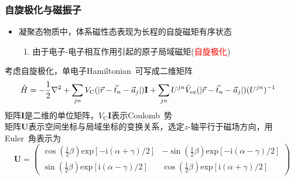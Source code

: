 {\frame
{
	\frametitle{自旋极化与磁振子}
	\begin{itemize}
		\item 凝聚态物质中，体系磁性态表现为长程的自旋磁矩有序状态
			\begin{enumerate}
				\item 由于电子-电子相互作用引起的原子局域磁矩(\textcolor{red}{自旋极化})
			\end{enumerate}
	\end{itemize}
		考虑自旋极化，单电子\textrm{Hamiltonian~}可写成二维矩阵
			\begin{displaymath}
				\hspace*{-10pt}\hat H=-\frac12\nabla^2+\sum_{jn}V_{\mathrm C}(|\vec r-\vec t_n-\vec a_j|)\mathbf{I}+\sum_{jn}U^{jn}\hat{V}_{\mathrm{ex}}(|\vec r-\vec t_n-\vec a_j|)(U^{jn})^{-1}
			\end{displaymath}
			矩阵$\mathbf{I}$是二维的单位矩阵，$V_{\mathrm{C}}\mathbf{I}$表示\textrm{Coulomb~}势\\
			矩阵$\mathbf{U}$表示空间坐标与局域坐标的变换关系，选定$z$-轴平行于磁场方向，用\textrm{Euler~}角表示为
			\begin{displaymath}
				\mathbf{U}=\left(
				\begin{matrix}
					\cos(\frac12\beta)\mathrm{exp}[-\mathrm{i}(\alpha+\gamma)/2] &-\sin(\frac12\beta)\mathrm{exp}[-\mathrm{i}(\alpha-\gamma)/2]\\
					\sin(\frac12\beta)\mathrm{exp}[\mathrm{i}(\alpha-\gamma)/2] &\cos(\frac12\beta)\mathrm{exp}[\mathrm{i}(\alpha+\gamma)/2]
				\end{matrix}\right)
			\end{displaymath}
		}

}
